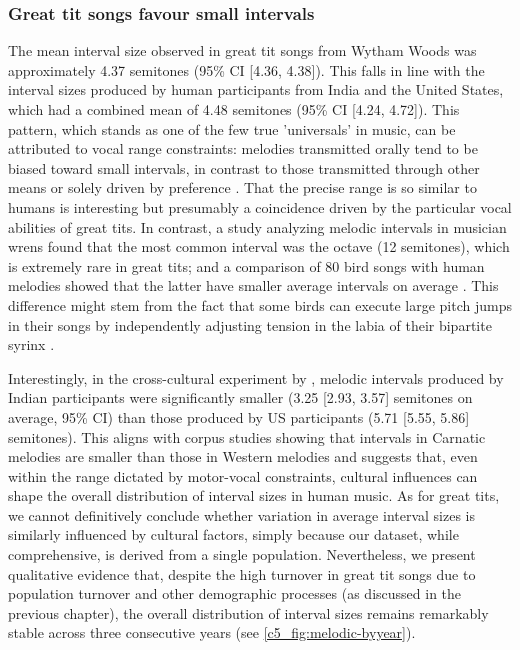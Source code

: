 \subsubsection{Great tit songs favour small intervals}

The mean interval size observed in great tit songs from Wytham Woods was approximately 4.37 semitones (95\% CI [4.36, 4.38]). This falls in line with the interval sizes produced by human participants from India and the United States, which had a combined mean of 4.48 semitones (95\% CI [4.24, 4.72]). This pattern, which stands as one of the few true 'universals' in music, can be attributed to vocal range constraints: melodies transmitted orally tend to be biased toward small intervals, in contrast to those transmitted through other means or solely driven by preference \textcite{anglada-tort2023}. That the precise range is so similar to humans is interesting but presumably a coincidence driven by the particular vocal abilities of great tits. In contrast, a study analyzing melodic intervals in musician wrens \autocite{doolittle2012} found that the most common interval was the octave (12 semitones), which is extremely rare in great tits; and a comparison of 80 bird songs with human melodies showed that the latter have smaller average intervals on average \autocite{tierney2011a}. This difference might stem from the fact that some birds can execute large pitch jumps in their songs by independently adjusting tension in the labia of their bipartite syrinx \autocite{suthers2004}.

Interestingly, in the cross-cultural experiment by \textcite{anglada-tort2023}, melodic intervals produced by Indian participants were significantly smaller (3.25 [2.93, 3.57] semitones on average, 95\% CI) than those produced by US participants (5.71 [5.55, 5.86] semitones). This aligns with corpus studies showing that intervals in Carnatic melodies are smaller than those in Western melodies \autocite{bowling2012} and suggests that, even within the range dictated by motor-vocal constraints, cultural influences can shape the overall distribution of interval sizes in human music. As for great tits, we cannot definitively conclude whether variation in average interval sizes is similarly influenced by cultural factors, simply because our dataset, while comprehensive, is derived from a single population. Nevertheless, we present qualitative evidence that, despite the high turnover in great tit songs due to population turnover and other demographic processes (as discussed in the previous chapter), the overall distribution of interval sizes remains remarkably stable across three consecutive years (see \autoref{c5_fig:melodic-byyear}).

